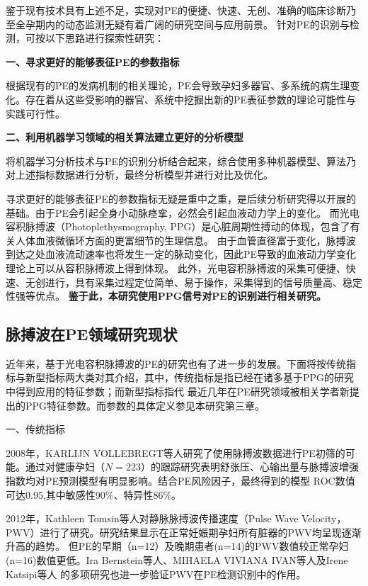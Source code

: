 鉴于现有技术具有上述不足，实现对PE的便捷、快速、无创、准确的临床诊断乃至全孕期内的动态监测无疑有着广阔的研究空间与应用前景。
针对PE的识别与检测，可按以下思路进行探索性研究：

\textbf{一、寻求更好的能够表征PE的参数指标}

根据现有的PE的发病机制的相关理论，PE会导致孕妇多器官、多系统的病生理变化。存在着从这些受影响的器官、系统中挖掘出新的PE表征参数的理论可能性与实践可行性。

\textbf{二、利用机器学习领域的相关算法建立更好的分析模型}

将机器学习分析技术与PE的识别分析结合起来，综合使用多种机器模型、算法乃对上述指标数据进行分析，最终分析模型并进行对比及优化。

寻求更好的能够表征PE的参数指标无疑是重中之重，是后续分析研究得以开展的基础。由于PE会引起全身小动脉痉挛，必然会引起血液动力学上的变化。
而光电容积脉搏波（Photoplethysmography, PPG）是心脏周期性搏动的体现，包含了有关人体血液微循环方面的更富细节的生理信息\cite{PPGYY}。
由于血管直径富于变化，脉搏波到达之处血液流动速率也将发生一定的脉动变化，因此PE导致的血液动力学变化理论上可以从容积脉搏波上得到体现。
此外，光电容积脉搏波的采集可便捷、快速、无创进行，具有采集过程定位简单、易于操作，采集得到的信号质量高、稳定性强等优点。
\textbf{鉴于此，本研究使用PPG信号对PE的识别进行相关研究。}

\subsection{脉搏波在PE领域研究现状}
近年来，基于光电容积脉搏波的PE的研究也有了进一步的发展。下面将按传统指标与新型指标两大类对其介绍，其中，传统指标是指已经在诸多基于PPG的研究中得到应用的特征参数；而新型指标指代
最近几年在PE研究领域被相关学者新提出的PPG特征参数。而参数的具体定义参见本研究第三章。

一、传统指标

2008年，KARLIJN VOLLEBREGT等人\cite{KARLIJN2008}研究了使用脉搏波数据进行PE初筛的可能。通过对健康孕妇（$N=223$）的跟踪研究表明舒张压、心输出量与脉搏波增强指数均对PE预测模型有明显影响。结合PE风险因子，最终得到的模型
ROC数值可达0.95,其中敏感性90\%、特异性86\%。

2012年，Kathleen Tomsin等人\cite{Tomsin2012}对静脉脉搏波传播速度（Pulse Wave Velocity，PWV）进行了研究。研究结果显示在正常妊娠期孕妇所有脏器的PWV均呈现逐渐升高的趋势。
但PE的早期（n=12）及晚期患者(n=14)的PWV数值较正常孕妇(n=16)数值更低。Ira Bernstein等人\cite{Ira2014}、MIHAELA VIVIANA IVAN等人\cite{VivianaIvan2018}及Irene Katsipi等人\cite{Katsipi2014}
的多项研究也进一步验证PWV在PE检测识别中的作用。

